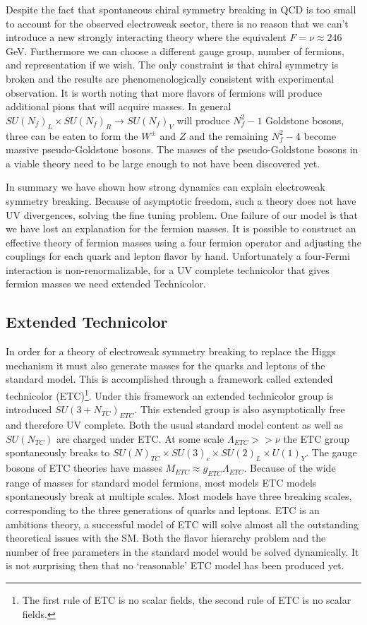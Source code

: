 Despite the fact that spontaneous chiral symmetry breaking in QCD is too small to account for the observed electroweak sector, there is no reason that we can't introduce a new strongly interacting theory where the equivalent $F=\nu\approx246$ GeV.
Furthermore we can choose a different gauge group, number of fermions, and representation if we wish.
The only constraint is that chiral symmetry is broken and the results are phenomenologically consistent with experimental observation.
It is worth noting that more flavors of fermions will produce additional pions that will acquire masses.
In general $SU(N_f)_L\times SU(N_f)_R\rightarrow SU(N_f)_V$ will produce $N^2_f-1$ Goldstone bosons, three can be eaten to form the $W^\pm$ and $Z$ and the remaining $N_f^2-4$ become massive pseudo-Goldstone bosons.
The masses of the pseudo-Goldstone bosons in a viable theory need to be large enough to not have been discovered yet.

In summary we have shown how strong dynamics can explain electroweak symmetry breaking.
Because of asymptotic freedom, such a theory does not have UV divergences, solving the fine tuning problem.
One failure of our model is that we have lost an explanation for the fermion masses.
It is possible to construct an effective theory of fermion masses using a four fermion operator and adjusting the couplings for each quark and lepton flavor by hand.
Unfortunately a four-Fermi interaction is non-renormalizable, for a UV complete technicolor that gives fermion masses we need extended Technicolor.

\subsection{Extended Technicolor}

In order for a theory of electroweak symmetry breaking to replace the Higgs mechanism it must also generate masses for the quarks and leptons of the standard model.
This is accomplished through a framework called extended technicolor (ETC)\footnote{The first rule of ETC is no scalar fields, the second rule of ETC is no scalar fields.}. 
Under this framework an extended technicolor group is introduced $SU(3+N_{TC})_{ETC}$.
This extended group is also asymptotically free and therefore UV complete.
Both the usual standard model content as well as $SU(N_{TC})$ are charged under ETC.
At some scale $\Lambda_{ETC}>>\nu$ the ETC group spontaneously breaks to $SU(N)_{TC}\times SU(3)_c\times SU(2)_L\times U(1)_Y$.
The gauge bosons of ETC theories have masses $M_{ETC} \approx g_{ETC}\Lambda_{ETC}$.
Because of the wide range of masses for standard model fermions, most models ETC models spontaneously break at multiple scales.
Most models have three breaking scales, corresponding to the three generations of quarks and leptons.
ETC is an ambitions theory, a successful model of ETC will solve almost all the outstanding theoretical issues with the SM. 
Both the flavor hierarchy problem and the number of free parameters in the standard model would be solved dynamically.
It is not surprising then that no `reasonable' ETC model has been produced yet.

